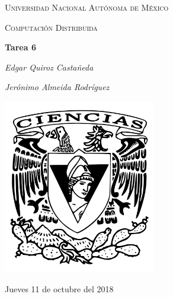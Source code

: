\documentclass[12pt,a4paper]{report}
\begin{document}
	\newcommand{\upon}[1]{\textbf{Upon} #1 \textbf{do}}

	\begin{titlepage}
		\centering
		{\scshape\LARGE Universidad Nacional Autónoma de México \par}
		\vspace{1cm}
		{\scshape\Large Computación Distribuida\par}
		\vspace{1.5cm}
		{\huge\bfseries Tarea 6\par}
		\vspace{.5cm}
		{\Large\itshape Edgar Quiroz Castañeda \par}
	    \vspace{.5cm}
		{\Large\itshape Jerónimo Almeida Rodríguez \par}
		\vfill
		 \includegraphics[width=0.5\textwidth]{escudo_f-ciencias.png}
		\vfill

		{\large Jueves 11 de octubre del 2018 \par}
	\end{titlepage}

	\pagebreak
	\setlength{\voffset}{-0.75in}
	\setlength{\headsep}{5pt}
\end{document}

